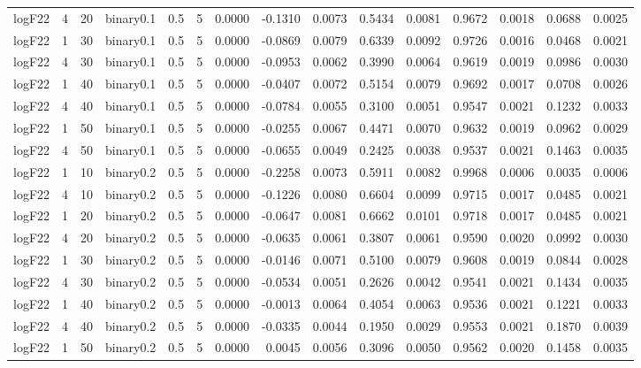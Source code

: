 \begin{longtable}{rrrrrrrrrrrrrrr}
  logF22 & 4 & 20 & binary0.1 & 0.5 & 5 & 0.0000 & -0.1310 & 0.0073 & 0.5434 & 0.0081 & 0.9672 & 0.0018 & 0.0688 & 0.0025 \\ 
  logF22 & 1 & 30 & binary0.1 & 0.5 & 5 & 0.0000 & -0.0869 & 0.0079 & 0.6339 & 0.0092 & 0.9726 & 0.0016 & 0.0468 & 0.0021 \\ 
  logF22 & 4 & 30 & binary0.1 & 0.5 & 5 & 0.0000 & -0.0953 & 0.0062 & 0.3990 & 0.0064 & 0.9619 & 0.0019 & 0.0986 & 0.0030 \\ 
  logF22 & 1 & 40 & binary0.1 & 0.5 & 5 & 0.0000 & -0.0407 & 0.0072 & 0.5154 & 0.0079 & 0.9692 & 0.0017 & 0.0708 & 0.0026 \\ 
  logF22 & 4 & 40 & binary0.1 & 0.5 & 5 & 0.0000 & -0.0784 & 0.0055 & 0.3100 & 0.0051 & 0.9547 & 0.0021 & 0.1232 & 0.0033 \\ 
  logF22 & 1 & 50 & binary0.1 & 0.5 & 5 & 0.0000 & -0.0255 & 0.0067 & 0.4471 & 0.0070 & 0.9632 & 0.0019 & 0.0962 & 0.0029 \\ 
  logF22 & 4 & 50 & binary0.1 & 0.5 & 5 & 0.0000 & -0.0655 & 0.0049 & 0.2425 & 0.0038 & 0.9537 & 0.0021 & 0.1463 & 0.0035 \\ 
  logF22 & 1 & 10 & binary0.2 & 0.5 & 5 & 0.0000 & -0.2258 & 0.0073 & 0.5911 & 0.0082 & 0.9968 & 0.0006 & 0.0035 & 0.0006 \\ 
  logF22 & 4 & 10 & binary0.2 & 0.5 & 5 & 0.0000 & -0.1226 & 0.0080 & 0.6604 & 0.0099 & 0.9715 & 0.0017 & 0.0485 & 0.0021 \\ 
  logF22 & 1 & 20 & binary0.2 & 0.5 & 5 & 0.0000 & -0.0647 & 0.0081 & 0.6662 & 0.0101 & 0.9718 & 0.0017 & 0.0485 & 0.0021 \\ 
  logF22 & 4 & 20 & binary0.2 & 0.5 & 5 & 0.0000 & -0.0635 & 0.0061 & 0.3807 & 0.0061 & 0.9590 & 0.0020 & 0.0992 & 0.0030 \\ 
  logF22 & 1 & 30 & binary0.2 & 0.5 & 5 & 0.0000 & -0.0146 & 0.0071 & 0.5100 & 0.0079 & 0.9608 & 0.0019 & 0.0844 & 0.0028 \\ 
  logF22 & 4 & 30 & binary0.2 & 0.5 & 5 & 0.0000 & -0.0534 & 0.0051 & 0.2626 & 0.0042 & 0.9541 & 0.0021 & 0.1434 & 0.0035 \\ 
  logF22 & 1 & 40 & binary0.2 & 0.5 & 5 & 0.0000 & -0.0013 & 0.0064 & 0.4054 & 0.0063 & 0.9536 & 0.0021 & 0.1221 & 0.0033 \\ 
  logF22 & 4 & 40 & binary0.2 & 0.5 & 5 & 0.0000 & -0.0335 & 0.0044 & 0.1950 & 0.0029 & 0.9553 & 0.0021 & 0.1870 & 0.0039 \\ 
  logF22 & 1 & 50 & binary0.2 & 0.5 & 5 & 0.0000 & 0.0045 & 0.0056 & 0.3096 & 0.0050 & 0.9562 & 0.0020 & 0.1458 & 0.0035 \\ 

\end{longtable}
